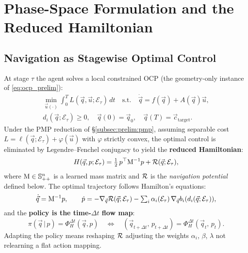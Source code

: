 \section{Phase-Space Formulation and the Reduced Hamiltonian}
\label{sec:ch3:formulation}

\subsection{Navigation as Stagewise Optimal Control}
\label{subsec:ch3:ocp}

At stage $\tau$ the agent solves a local constrained OCP
(the geometry-only instance of \cref{eq:ocp_prelim}):
\begin{equation}
\begin{aligned}
\min_{\vec{u}(\cdot)} \int_0^T L(\vec{q},\vec{u};\mathcal{E}_\tau)\,dt 
\quad\text{s.t.}\quad 
\dot{\vec{q}} = f(\vec{q}) + A(\vec{q})\vec{u},\\
d_i(\vec{q};\mathcal{E}_\tau) \geq 0,\quad 
\vec{q}(0)=\vec{q}_0,\quad 
\vec{q}(T)=\vec{c}_{\mathrm{target}}.
\end{aligned}
\label{eq:ch3:ocp}
\end{equation}
Under the PMP reduction of \S\ref{subsec:prelim:pmp},
assuming separable cost $L = \ell(\vec{q};\mathcal{E}_\tau) + \varphi(\vec{u})$
with $\varphi$ strictly convex, the optimal control is eliminated by
Legendre–Fenchel conjugacy to yield the \textbf{reduced Hamiltonian}:
\begin{equation}
  H(\vec{q},p;\mathcal{E}_\tau)
  = \tfrac{1}{2}\,p^\top\mathrm{M}^{-1}p
    + \mathcal{R}(\vec{q};\mathcal{E}_\tau),
  \label{eq:ch3:ham}
\end{equation}
where $\mathrm{M} \in \mathbb{S}^n_{++}$ is a learned mass matrix and
$\mathcal{R}$ is the \emph{navigation potential} defined below.
The optimal trajectory follows Hamilton's equations:
\begin{equation}
  \dot{\vec{q}} = \mathrm{M}^{-1}p,
  \qquad
  \dot{p} = -\nabla_{\vec{q}}\mathcal{R}(\vec{q};\mathcal{E}_\tau)
             - \textstyle\sum_i \alpha_i(\mathcal{E}_\tau)\,
               \nabla_{\vec{q}} b_i(d_i(\vec{q};\mathcal{E}_\tau)),
  \label{eq:ch3:ham_eqs}
\end{equation}
and the \textbf{policy is the time-$\Delta t$ flow map}:
\begin{equation}
  \pi(\vec{q}\,|\,p)
  = \Phi^{\Delta t}_H(\vec{q},p)
  \quad\Leftrightarrow\quad
  (\vec{q}_{t+\Delta t},\,p_{t+\Delta t}) = \Phi^{\Delta t}_H(\vec{q}_t,\,p_t).
  \label{eq:ch3:policy}
\end{equation}
Adapting the policy means reshaping $\mathcal{R}$ adjusting the weights
$\alpha_i$, $\beta$, $\lambda$ not relearning a flat action mapping.

